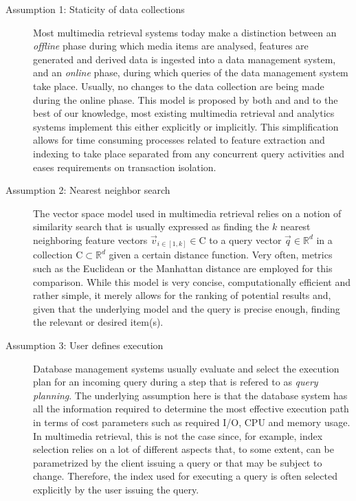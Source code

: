 \begin{description}
    \item[Assumption 1: Staticity of data collections] Most multimedia retrieval systems today make a distinction between an \emph{offline} phase during which media items are analysed, features are generated and derived data is ingested into a data management system, and an \emph{online} phase, during which queries of the data management system take place. Usually, no changes to the data collection are being made during the online phase. This model is proposed by both \cite{Giangreco:2018thesis} and \cite{Rossetto:2018thesis} and to the best of our knowledge, most existing multimedia retrieval and analytics systems implement this either explicitly or implicitly. This simplification allows for time consuming processes related to feature extraction and indexing to take place separated from any concurrent query activities and eases requirements on transaction isolation. 

    \item[Assumption 2: Nearest neighbor search] The vector space model used in multimedia retrieval relies on a notion of similarity search that is usually expressed as finding the $k$ nearest neighboring feature vectors $\vec{v}_{i \in \left[1,k\right]} \in \mathrm{C}$ to a query vector $\vec{q} \in \mathbb{R}^d$ in a collection $\mathrm{C} \subset \mathbb{R}^d$ given a certain distance function. Very often, metrics such as the Euclidean or the Manhattan distance are employed for this comparison. While this model is very concise, computationally efficient and rather simple, it merely allows for the ranking of potential results and, given that the underlying model and the query is precise enough, finding the relevant or desired item(s).

    \item[Assumption 3: User defines execution] Database management systems usually evaluate and select the execution plan for an incoming query during a step that is refered to as \emph{query planning}. The underlying assumption here is that the database system has all the information required to determine the most effective execution path in terms of cost parameters such as required I/O, CPU and memory usage. In multimedia retrieval, this is not the case since, for example, index selection relies on a lot of different aspects that, to some extent, can be parametrized by the client issuing a query or that may be subject to change. Therefore, the index used for executing a query is often selected explicitly by the user issuing the query.
\end{description}

